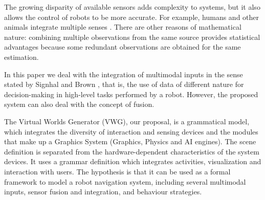 \documentclass{svmult}
\begin{document}
The growing disparity of available sensors adds complexity to systems, but it also allows the control of robots to be more accurate. For example, humans and other animals integrate multiple senses \cite{Sharma1998}. There are other reasons of mathematical nature: combining multiple observations from the same source provides statistical advantages because some redundant observations are obtained for the same estimation.


In this paper we deal with the integration of multimodal inputs in the sense stated by Signhal and Brown \cite{Singhal1997}, that is, the use of data of different nature for decision-making in high-level tasks performed by a robot. However, the proposed system can also deal with the concept of fusion. 


The Virtual Worlds Generator (VWG), our proposal, is a grammatical model, which integrates the diversity of interaction and sensing devices and the modules that make up a Graphics System (Graphics, Physics and AI engines). The scene definition is separated from the hardware-dependent characteristics of the system devices. It uses a grammar definition which integrates activities, visualization and interaction with users. The hypothesis is that it can be used as a formal framework to model a robot navigation system, including several multimodal inputs, sensor fusion and integration, and behaviour strategies.
\end{document}
